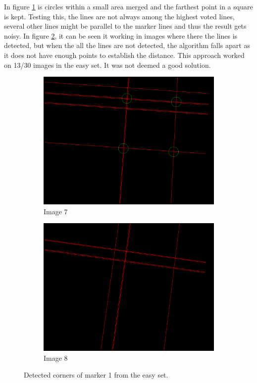 In figure \ref{fig:crossing_points} is circles within a small area merged and the farthest point in a square is kept.
Testing this, the lines are not always among the highest voted lines, several other lines might be parallel to the marker lines and thus the result gets noisy.
In figure \ref{fig:crossing_points_marker}, it can be seen it working in images where there the lines is detected, but when the all the lines are not detected, 
the algorithm falls apart as it does not have enough points to establish the distance.
This approach worked on 13/30 images in the easy set.
It was not deemed a good solution.

\begin{figure}
 \centering
 \begin{subfigure}{0.49\linewidth}
 \includegraphics[width=\linewidth]{graphics/Detected_points_marker1a_7}
 \caption{Image 7}
 \label{fig:crossing_points}
 \end{subfigure}
 \begin{subfigure}{0.49\linewidth}
 \includegraphics[width=\linewidth]{graphics/Detected_points_marker1a_8}
 \caption{Image 8}
 \end{subfigure}
 \caption{Detected corners of marker 1 from the easy set.}
 \label{fig:crossing_points_marker}
\end{figure}

